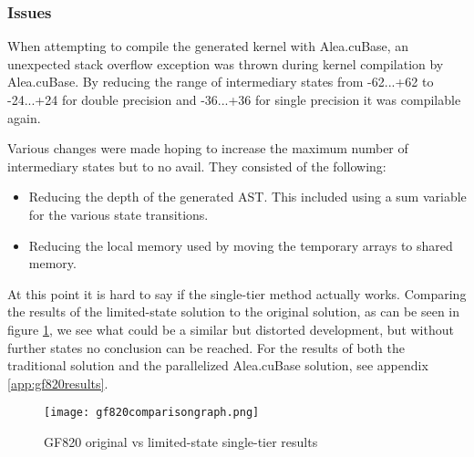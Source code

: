 \subsubsection{Issues}
When attempting to compile the generated kernel with Alea.cuBase, an unexpected stack overflow exception was thrown during kernel compilation by Alea.cuBase.
By reducing the range of intermediary states from -62...+62 to -24...+24 for double precision and -36...+36 for single precision it was compilable again.

Various changes were made hoping to increase the maximum number of intermediary states but to no avail.
They consisted of the following:
\begin{itemize}
\item Reducing the depth of the generated AST. This included using a sum variable for the various state transitions.
\item Reducing the local memory used by moving the temporary arrays to shared memory.
\end{itemize}

At this point it is hard to say if the single-tier method actually works. 
Comparing the results of the limited-state solution to the original solution, as can be seen in figure \ref{fig:gf820comparisongraph}, we see what could be a similar but distorted development, but without further states no conclusion can be reached.
For the results of both the traditional solution and the parallelized Alea.cuBase solution, see appendix \ref{app:gf820results}.

\begin{figure}[h!]\centering
\texttt{[image: gf820comparisongraph.png]}
\caption{GF820 original vs limited-state single-tier results\label{fig:gf820comparisongraph}}
\end{figure}
